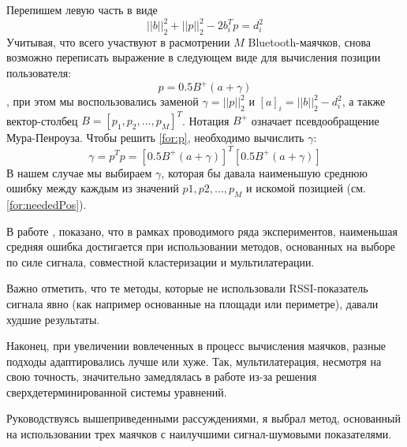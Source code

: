 \begin{enumerate}
\[    \]
    Перепишем левую часть в виде
    \begin{equation} \label{for:neededPos}
            || b ||^2_2 + || p ||^2_2 - 2b_i^Tp = d_i^2    
    \end{equation}
    Учитывая, что всего участвуют в расмотрении $M$ Bluetooth-маячков, снова возможно переписать выражение в следующем виде для вычисления позиции пользователя:
    \begin{equation} \label{for:p}
        p = 0.5B^+(a+\gamma)    
    \end{equation}
    , при этом мы воспользовались заменой $\gamma = || p ||^2_2$ и $[a]_i = || b ||^2_2 - d_i^2$, а также вектор-столбец $B = [p_1, p_2, ..., p_M]^T$. Нотация $B^+$ означает псевдообращение Мура-Пенроуза. Чтобы решить \ref{for:p}, необходимо вычислить $\gamma$:
    \[
        \gamma = p^T p = [0.5B^+(a+\gamma)]^T [0.5B^+(a+\gamma)]
    \]
    В нашем случае мы выбираем $\gamma$, которая бы давала наименьшую среднюю ошибку между каждым из значений $p1, p2, ..., p_M$ и искомой позицией (см. \ref{for:neededPos}). \\
\end{enumerate}

    В работе \cite{artemenko2012comparison}, показано, что в рамках проводимого ряда экспериментов, наименьшая средняя ошибка достигается при использовании методов, основанных на выборе по силе сигнала, совместной кластеризации и мультилатерации. 
    
    Важно отметить, что те методы, которые не использовали RSSI-показатель сигнала явно (как например основанные на площади или периметре), давали худшие результаты. 
    
    Наконец, при увеличении вовлеченных в процесс вычисления маячков, разные подходы адаптировались лучше или хуже. Так, мультилатерация, несмотря на свою точность, значительно замедлялась в работе из-за решения сверхдетерминированной системы уравнений. 
    
    Руководствуясь вышеприведенными рассуждениями, я выбрал метод, основанный на использовании трех маячков с наилучшими сигнал-шумовыми показателями.